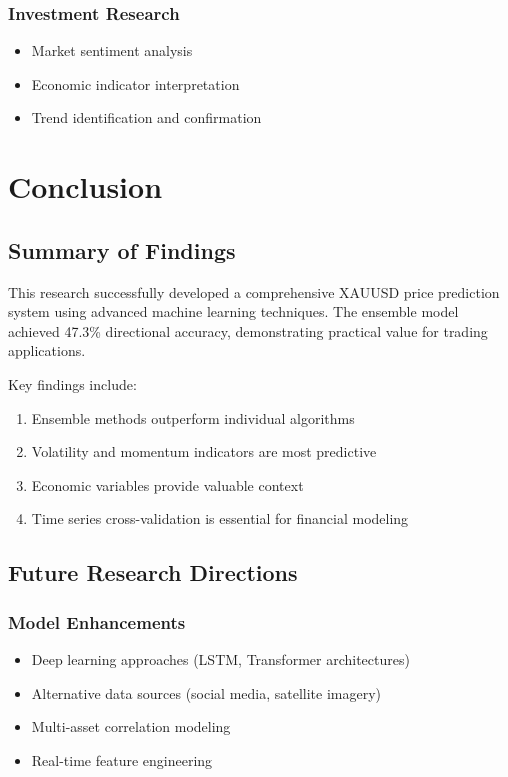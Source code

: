 \documentclass[12pt,a4paper]{article}
\begin{document}
\subsubsection{Investment Research}
\begin{itemize}
    \item Market sentiment analysis
    \item Economic indicator interpretation
    \item Trend identification and confirmation
\end{itemize}

\section{Conclusion}

\subsection{Summary of Findings}

This research successfully developed a comprehensive XAUUSD price prediction system using advanced machine learning techniques. The ensemble model achieved 47.3\% directional accuracy, demonstrating practical value for trading applications.

Key findings include:
\begin{enumerate}
    \item Ensemble methods outperform individual algorithms
    \item Volatility and momentum indicators are most predictive
    \item Economic variables provide valuable context
    \item Time series cross-validation is essential for financial modeling
\end{enumerate}

\subsection{Future Research Directions}

\subsubsection{Model Enhancements}
\begin{itemize}
    \item Deep learning approaches (LSTM, Transformer architectures)
    \item Alternative data sources (social media, satellite imagery)
    \item Multi-asset correlation modeling
    \item Real-time feature engineering
\end{itemize}
\end{document}
